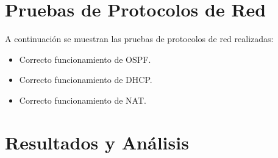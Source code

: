 \section{Pruebas de Protocolos de Red}
A continuación se muestran las pruebas de protocolos de red realizadas:
\begin{itemize}
    \item Correcto funcionamiento de OSPF.
    \item Correcto funcionamiento de DHCP.
    \item Correcto funcionamiento de NAT.
\end{itemize}

\section{Resultados y Análisis}
